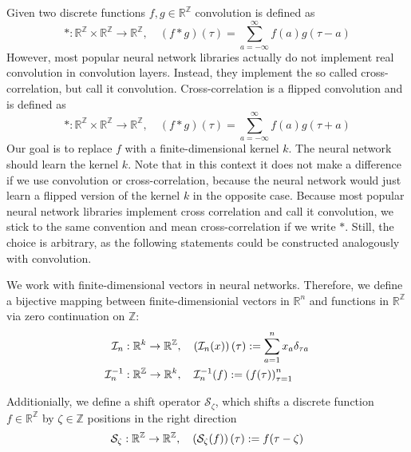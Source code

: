 \documentclass[twoside,a4paper]{article}
\begin{document}
Given two discrete functions $f,g \in \mathbb{R}^\mathbb{Z}$ convolution is defined as 
\begin{equation*}
	*: \mathbb{R}^{\mathbb{Z}} \times \mathbb{R}^{\mathbb{Z}} \to \mathbb{R}^{\mathbb{Z}},
	\quad (f*g)(\tau) = \sum^{\infty}_{a=-\infty} f(a) g(\tau - a)
\end{equation*}
However, most popular neural network libraries actually do not implement real convolution
in convolution layers. Instead, they implement the so called cross-correlation, but call it convolution. 
Cross-correlation is a flipped convolution and is defined as
\begin{equation*}
	*: \mathbb{R}^{\mathbb{Z}} \times \mathbb{R}^{\mathbb{Z}} \to \mathbb{R}^{\mathbb{Z}},
	\quad (f*g)(\tau) = \sum^{\infty}_{a=-\infty} f(a) g(\tau + a)
\end{equation*}
Our goal is to replace $f$ with a finite-dimensional kernel $k$. The neural network should learn the kernel $k$.
Note that in this context it does not make a difference if we use convolution or cross-correlation, because
the neural network would just learn a flipped version of the kernel $k$ in the opposite case.
Because most popular neural network libraries implement cross correlation and call it convolution,
we stick to the same convention and mean cross-correlation if we write $*$.
Still, the choice is arbitrary, as the following statements could be constructed analogously with convolution.

We work with finite-dimensional vectors in neural networks. Therefore, we define a bijective mapping between
finite-dimensionial vectors in $\mathbb{R}^n$ and functions in $\mathbb{R}^{\mathbb{Z}}$ 
via zero continuation on $\mathbb{Z}$:
\begin{align*}
	\mathcal{I}_n &: \mathbb{R}^k \to \mathbb{R}^{\mathbb{Z}},
	\quad \left(\mathcal{I}_n(x)\right)(\tau) := \sum_{a=1}^{n} x_a \delta_{\tau a} \\
	\mathcal{I}_n^{-1} &: \mathbb{R}^{\mathbb{Z}} \to \mathbb{R}^k,
	\quad \mathcal{I}_n^{-1}(f) := \left( f(\tau) \right)_{\tau=1}^n
\end{align*}

Additionially, we define a shift operator $\mathcal{S}_\zeta$, 
which shifts a discrete function $f \in \mathbb{R}^\mathbb{Z}$ by $\zeta \in \mathbb{Z}$ positions
in the right direction
\begin{equation*}
	\mathcal{S}_\zeta : \mathbb{R}^{\mathbb{Z}} \to \mathbb{R}^{\mathbb{Z}},
	\quad \left( \mathcal{S}_\zeta(f) \right) (\tau) := f(\tau - \zeta)
\end{equation*}
\end{document}
